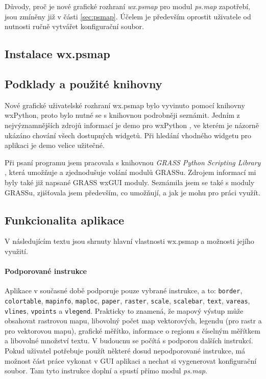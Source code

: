 \documentclass[a4paper,12pt,draft]{article}
\newcommand{\modul}[1]{\emph{#1}}
\newcommand{\instr}[1]{\lstinline[style=psmapInline]|#1|}
\begin{document}
Důvody, proč je nové grafické rozhraní \emph{wx.psmap} pro modul \modul{ps.map} zapotřebí, jsou zmíněny již v části \ref{sec:psmap}. Účelem je především oprostit uživatele od nutnosti ručně vytvářet konfigurační soubor. 

\subsection{Instalace wx.psmap}
\subsection{Podklady a použité knihovny}
Nové grafické uživatelské rozhraní wx.psmap bylo vyvinuto pomocí knihovny wxPython, 
proto bylo nutné se s knihovnou podrobněji seznámit. Jedním z nejvýznamnějších zdrojů informací je demo pro wxPython \cite{demo}, ve kterém je názorně ukázáno chování všech dostupných widgetů. Při hledání vhodného widgetu pro aplikaci je demo velice užitečné. 

Při psaní programu jsem pracovala s knihovnou \emph{GRASS Python Scripting Library} \cite{script}, která umožňuje a zjednodušuje volání modulů GRASSu. Zdrojem informací mi byly také již napsané GRASS wxGUI moduly. Seznámila jsem se také s moduly GRASSu, zjišťovala jsem především, co umožňují, a jak je mohu pro práci využít. 

\subsection{Funkcionalita aplikace}
V následujícím textu jsou shrnuty hlavní vlastnosti wx.psmap a možnosti jejího využití.

\paragraph*{Podporované instrukce}
    Aplikace v současné době podporuje pouze vybrané instrukce, a to: \instr{border}, \instr{colortable}, \instr{mapinfo}, \instr{maploc}, \instr{paper}, \instr{raster}, \instr{scale}, \instr{scalebar}, \instr{text}, \instr{vareas}, \instr{vlines}, \instr{vpoints} a \instr{vlegend}. Prakticky to znamená, že mapový výstup může obsahovat rastrovou mapu, libovolný počet map vektorových, legendu (pro rastr a pro vektorovou mapu), grafické měřítko, informace o regionu s číselným měřítkem a libovolné množství textu. V budoucnu se počítá s podporou dalších instrukcí. Pokud uživatel potřebuje použít některé dosud nepodporované instrukce, má možnost část práce vykonat v GUI aplikaci a nechat si vygenerovat konfigurační soubor. Tam tyto instrukce doplní a spustí přímo modul \modul{ps.map}.
    
\end{document}
